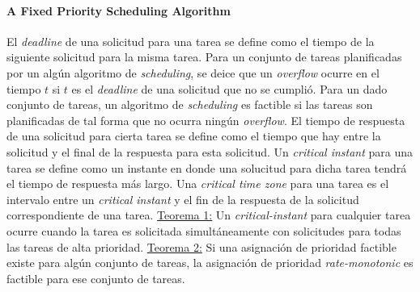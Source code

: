 \paragraph{\textnormal{\textbf{A Fixed Priority Scheduling Algorithm}}}
El \emph{deadline} de una solicitud para una tarea se define como el tiempo de la siguiente solicitud para la misma tarea. Para un conjunto de tareas planificadas por un algún algoritmo de \emph{scheduling}, se deice que un \emph{overflow} ocurre en el tiempo $t$ si $t$ es el \emph{deadline} de una solicitud que no se cumplió. Para un dado conjunto de tareas, un algoritmo de \emph{scheduling} es factible si las tareas son planificadas de tal forma que no ocurra ningún \emph{overflow}. El tiempo de respuesta de una solicitud para cierta tarea se define como el tiempo que hay entre la solicitud y el final de la respuesta para esta solicitud.  Un \emph{critical instant} para una tarea se define como un instante en donde una solucitud para dicha tarea tendrá el tiempo de respuesta más largo. Una \emph{critical time zone} para una tarea es el intervalo entre un \emph{critical instant} y el fin de la respuesta de la solicitud correspondiente de una tarea. \underline{Teorema 1:} Un \emph{critical-instant} para cualquier tarea ocurre cuando la tarea es solicitada simultáneamente con solicitudes para todas las tareas de alta prioridad. \underline{Teorema 2:} Si una asignación de prioridad factible existe para algún conjunto de tareas, la asignación de prioridad \emph{rate-monotonic} es factible para ese conjunto de tareas.

